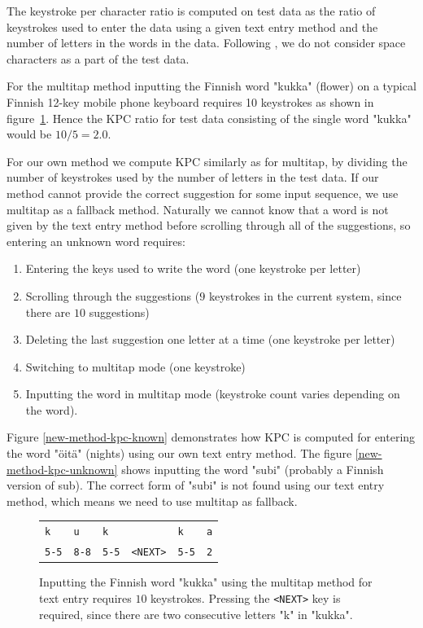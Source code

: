 \documentclass{llncs}
\begin{document}
The keystroke per character ratio is computed on test data as the
ratio of keystrokes used to enter the data using a given text entry
method and the number of letters in the words in the data. Following
\cite{Tantug:2010}, we do not consider space characters as a part of
the test data.

For the multitap method inputting the Finnish word "kukka" (flower) on
a typical Finnish 12-key mobile phone keyboard requires 10 keystrokes
as shown in figure~\ref{kukka-kpc}. Hence the KPC ratio for test data
consisting of the single word "kukka" would be $10/5 = 2.0$.

For our own method we compute KPC similarly as for multitap, by
dividing the number of keystrokes used by the number of letters in the
test data. If our method cannot provide the correct suggestion for
some input sequence, we use multitap as a fallback method. Naturally
we cannot know that a word is not given by the text entry method
before scrolling through all of the suggestions, so entering an
unknown word requires:
\begin{enumerate}
\item Entering the keys used to write the word (one keystroke per letter)
\item Scrolling through the suggestions ($9$ keystrokes in the current system, since there are $10$ suggestions)
\item Deleting the last suggestion one letter at a time (one keystroke per letter)
\item Switching to multitap mode (one keystroke)
\item Inputting the word in multitap mode (keystroke count varies depending on the word).
\end{enumerate}

Figure \ref{new-method-kpc-known} demonstrates how KPC is computed for
entering the word "\"{o}it\"{a}" (nights) using our own text entry
method. The figure \ref{new-method-kpc-unknown} shows inputting the word "subi" (probably a
Finnish version of sub). The correct form of "subi" is not found using our text
entry method, which means we need to use multitap as fallback.

\begin{figure}[htb!]
\begin{center}
\begin{tabular}{llllll}
\texttt{k} & \texttt{u} & \texttt{k} & & \texttt{k} & \texttt{a}
\\ \texttt{5-5} & \texttt{8-8} & \texttt{5-5} & \texttt{<NEXT>} &
\texttt{5-5} & \texttt{2}
\end{tabular}
\caption{Inputting the Finnish word "kukka" using the multitap method
  for text entry requires $10$ keystrokes. Pressing the
  \texttt{<NEXT>} key is required, since there are two consecutive
  letters "k" in "kukka".}\label{kukka-kpc}
\end{center}
\end{figure}
\end{document}
